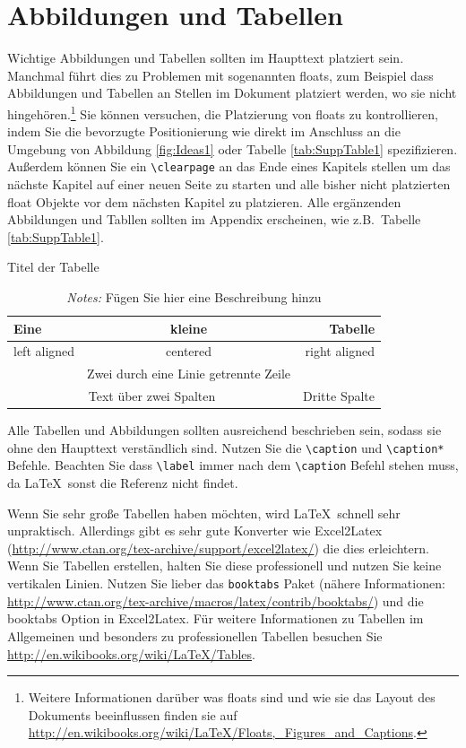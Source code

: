 \documentclass[a4paper,12pt]{scrartcl} %
\begin{document}

\section{Abbildungen und Tabellen}

Wichtige Abbildungen und Tabellen sollten im Haupttext platziert sein. Manchmal führt dies zu Problemen mit sogenannten floats, zum Beispiel dass Abbildungen und Tabellen an Stellen im Dokument platziert werden, wo sie nicht hingehören.\footnote{Weitere Informationen darüber was floats sind und wie sie das Layout des Dokuments beeinflussen finden sie auf \url{http://en.wikibooks.org/wiki/LaTeX/Floats,_Figures_and_Captions}.} Sie können versuchen, die Platzierung von floats zu kontrollieren, indem Sie die bevorzugte Positionierung wie direkt im Anschluss an die Umgebung von Abbildung \ref{fig:Ideas1} oder Tabelle \ref{tab:SuppTable1} spezifizieren. Außerdem können Sie ein \verb|\clearpage| an das Ende eines Kapitels stellen um das nächste Kapitel auf einer neuen Seite zu starten und alle bisher nicht platzierten float Objekte vor dem nächsten Kapitel zu platzieren. Alle ergänzenden Abbildungen und Tabllen sollten im Appendix erscheinen, wie z.B.\ Tabelle \ref{tab:SuppTable1}.

\begin{table}
\caption[Titel für Inhaltsverzeichnis]{Titel der Tabelle}
\label{tab:Table1}
\centering
 \begin{tabular}{lcr}
   Eine & kleine  & Tabelle\\
\toprule
   left aligned & centered & right aligned \\
   & Zwei durch eine Linie getrennte Zeile  & \\
\cmidrule{2-3}
   \multicolumn{2}{c}{Text über zwei Spalten} & Dritte Spalte \\
\bottomrule
\end{tabular}
\caption*{\footnotesize{\emph{Notes:} Fügen Sie hier eine Beschreibung hinzu}} %
\end{table}

Alle Tabellen und Abbildungen sollten ausreichend beschrieben sein, sodass sie ohne den Haupttext verständlich sind. Nutzen Sie die \verb|\caption| und \verb|\caption*| Befehle. Beachten Sie dass \verb|\label| immer nach dem \verb|\caption| Befehl stehen muss, da \LaTeX\ sonst die Referenz nicht findet.

Wenn Sie sehr große Tabellen haben möchten, wird \LaTeX\ schnell sehr unpraktisch. Allerdings gibt es sehr gute Konverter wie Excel2Latex (\url{http://www.ctan.org/tex-archive/support/excel2latex/}) die dies erleichtern. Wenn Sie Tabellen erstellen, halten Sie diese professionell und nutzen Sie keine vertikalen Linien. Nutzen Sie lieber das \texttt{booktabs} Paket (nähere Informationen: \url{http://www.ctan.org/tex-archive/macros/latex/contrib/booktabs/}) und die booktabs Option in Excel2Latex. Für weitere Informationen zu Tabellen im Allgemeinen und besonders zu professionellen Tabellen besuchen Sie \url{http://en.wikibooks.org/wiki/LaTeX/Tables}.
\end{document}
